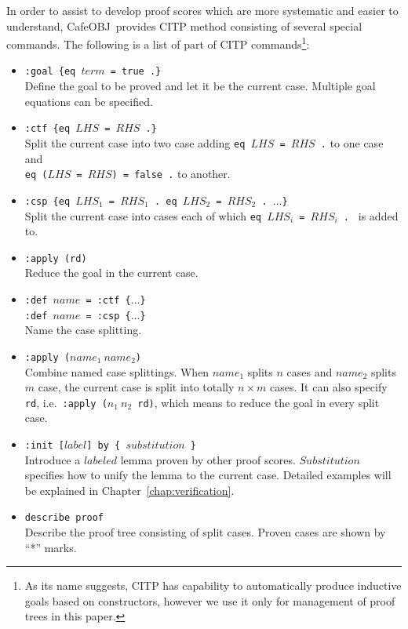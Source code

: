 \documentclass[12pt]{report}
\newcommand{\stt}[1]{{\small{\tt {#1}}}}
\newcommand{\cafeobj}{{\sf CafeOBJ}~}
\begin{document}
In order to assist to develop proof scores which are more systematic
and easier to understand, \cafeobj provides CITP method consisting of
several special commands. The following is a list of part of CITP
commands\footnote{As its name suggests, CITP has capability to
  automatically produce inductive goals based on constructors, however
  we use it only for management of proof trees in this paper.}:
\begin{itemize}
\item \stt{:goal \{eq $term$ = true .\}}\\ Define the goal to be
  proved and let it be the current case. Multiple goal equations
  can be specified.
\item \stt{:ctf \{eq $LHS$ = $RHS$ .\}}\\
  Split the current case into two case adding \stt{eq~$LHS$~=~$RHS$~.} to one case and\\
  \stt{eq~($LHS$~=~$RHS$)~=~false~.} to another.
\item \stt{:csp \{eq $LHS_1$ = $RHS_1$ . eq $LHS_2$ = $RHS_2$ . $\dots$\}}\\
  Split the current case into cases each of which
  \stt{eq~$LHS_i$~=~$RHS_i$~.~} is added to.
\item \stt{:apply (rd)}\\
 Reduce the goal in the current case.
\item \stt{:def $name$ = :ctf \{$\dots$\}}\\
  \stt{:def $name$ = :csp \{$\dots$\}}\\
  Name the case splitting.
\item \stt{:apply ($name_1\ name_2$)}\\ Combine named case
  splittings. When $name_1$ splits $n$ cases and $name_2$ splits $m$
  case, the current case is split into totally $n\times m$ cases.  It
  can also specify {\tt rd}, i.e.\ \stt{:apply~($n_1\ n_2$~rd)}, which
    means to reduce the goal in every split case.
\item \stt{:init [$label$] by \{ $substitution$ \}}\\
  Introduce a $labeled$ lemma proven by other proof scores. $Substitution$ specifies
  how to unify the lemma to the current case. Detailed examples will be explained
  in Chapter~\ref{chap:verification}.
\item \stt{describe proof}\\
 Describe the proof tree consisting of split cases. Proven cases are shown by ``*'' marks.
\end{itemize}
\end{document}
